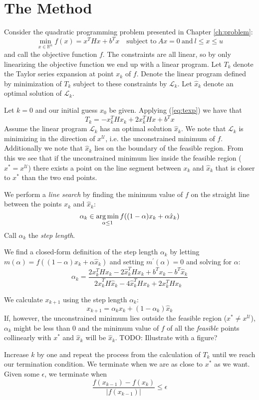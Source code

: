 \section{The Method}
\label{sec:method}
Consider the quadratic programming problem presented in Chapter
\ref{ch:problem}:
\[
\min_{x \in \mathbb{R}^n} f(x) = x^T H x + b^T x
\quad \textrm{subject to}
~
Ax = 0
~
\textrm{and}
~
l \le x \le u
\]
and call the objective function $f$.
The constraints are all linear, so by only linearizing the objective function
we end up with a linear program.
Let $T_k$ denote the Taylor series expansion at point $x_k$ of $f$.
Denote the linear program defined by minimization of $T_k$ subject to these
constraints by $\mathcal{L}_k$.
Let $\hat{x}_k$ denote an optimal solution of $\mathcal{L}_k$.

Let $k = 0$ and our initial guess $x_0$ be given.
Applying (\ref{eq:texp}) we have that
\[
T_k = - x_k^THx_k + 2x_k^THx + b^Tx
\]
Assume the linear program $\mathcal{L}_k$ has an optimal solution $\hat{x}_k$.
We note that $\mathcal{L}_k$ is minimizing in the direction of
$x^{\mathcal{U}}$, i.e. the unconstrained minimum of $f$.
Additionally we note that $\hat{x}_k$ lies on the boundary of the feasible
region.
From this we see that if the unconstrained minimum lies inside the feasible
region ($x^* = x^\mathcal{U}$) there exists a point on the line segment between
$x_k$ and $\hat{x}_k$ that is closer to $x^*$ than the two end points.

We perform a \emph{line search} by finding the minimum value of $f$ on the
straight line between the points $x_k$ and $\hat{x}_k$:
\[
\alpha_k \in \operatorname*{arg\,min}_{\alpha \leq 1} f((1-\alpha) x_k + \alpha \hat{x}_k)
\]
Call $\alpha_k$ the \emph{step length}.

We find a closed-form definition of the step length $\alpha_k$ by letting
$m(\alpha) = f((1-\alpha) x_k + \alpha \hat{x}_k)$ and setting
$m^\prime(\alpha) = 0$ and solving for $\alpha$:
\[
\alpha_k = \frac{
                2x_k^T H x_k
                - 2\hat{x}_k^T H x_k
                + b^T x_k - b^T \hat{x}_k
                }{
                  2\hat{x}_k^T H \hat{x}_k
                - 4\hat{x}_k^T H x_k
                + 2x_k^T H x_k
                }
\]

We calculate $x_{k+1}$ using the step length $\alpha_k$:
\[
x_{k+1} = \alpha_k x_k + (1-\alpha_k)\hat{x}_k
\]
If, however, the unconstrained minimum lies outside the feasible region
($x^* \neq x^\mathcal{U}$), $\alpha_k$ might be less than $0$ and the minimum
value of $f$ of all the \emph{feasible} points collinearly with $x^*$ and
$\hat{x}_k$ will be $\hat{x}_k$.
TODO: Illustrate with a figure?

Increase $k$ by one and repeat the process from the calculation of $T_k$ until
we reach our termination condition.
We terminate when we are as close to $x^*$ as we want.
Given some $\epsilon$, we terminate when
\[
\frac{f(x_{k-1}) - f(x_k)}{|f(x_{k-1})|} \leq \epsilon
\]


